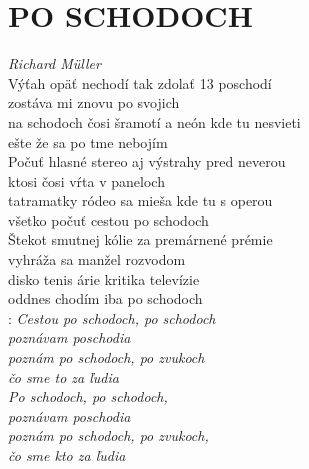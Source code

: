 \section*{\Huge PO SCHODOCH}
\emph{Richard Müller}\\

Výťah opäť nechodí tak zdolať 13 poschodí\\
zostáva mi znovu po svojich\\
na schodoch čosi šramotí a neón kde tu nesvieti\\
ešte že sa po tme nebojím\\

Počuť hlasné stereo aj výstrahy pred neverou\\
ktosi čosi vŕta v paneloch\\
tatramatky ródeo sa mieša kde tu s operou\\
všetko počuť cestou po schodoch\\

Štekot smutnej kólie za premárnené prémie\\
vyhráža sa manžel rozvodom\\
disko tenis árie kritika televízie\\
oddnes chodím iba po schodoch\\

\textregistered: \emph{Cestou po schodoch, po schodoch\\
poznávam poschodia\\
poznám po schodoch, po zvukoch\\
čo sme to za ľudia}\\

\emph{Po schodoch, po schodoch,\\
poznávam poschodia\\
poznám po schodoch, po zvukoch,\\
čo sme kto za ľudia}

\newpage
